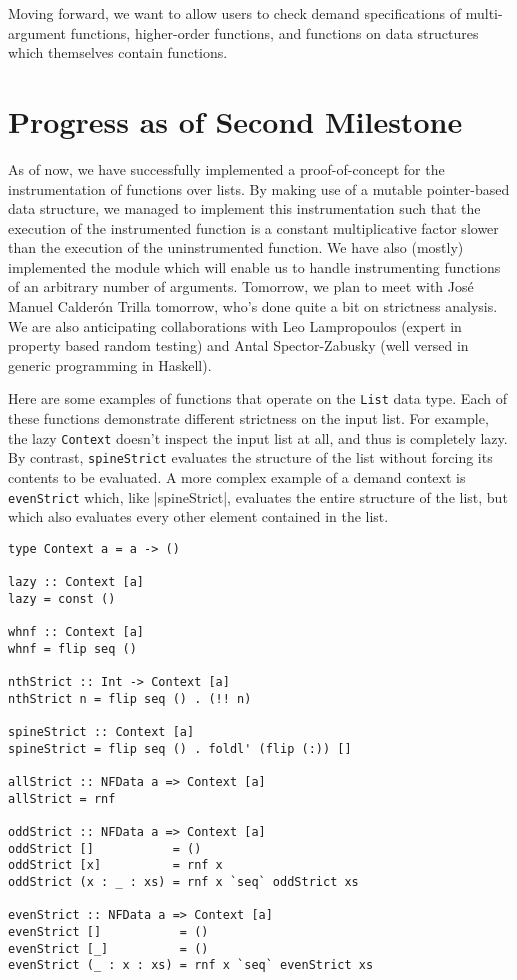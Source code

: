 \documentclass{article}
\begin{document}
Moving forward, we want to allow users to check demand specifications
of multi-argument functions, higher-order functions, and functions on
data structures which themselves contain functions.

\section{Progress as of Second Milestone}

As of now, we have successfully implemented a proof-of-concept for the
instrumentation of functions over lists. By making use of a mutable
pointer-based data structure, we managed to implement this instrumentation such
that the execution of the instrumented function is a constant multiplicative
factor slower than the execution of the uninstrumented function. We have also
(mostly) implemented the module which will enable us to handle instrumenting
functions of an arbitrary number of arguments. Tomorrow, we plan to meet with
Jos\'e Manuel Calder\'on Trilla tomorrow, who's done quite a bit on strictness
analysis. We are also anticipating collaborations with Leo Lampropoulos (expert
in property based random testing) and Antal Spector-Zabusky (well versed in
generic programming in Haskell).

Here are some examples of functions that operate on the \verb|List| data type.
Each of these functions demonstrate different strictness on the input list. For example, the lazy \verb|Context| doesn't inspect the input list at all, and thus is completely lazy. By contrast, \verb|spineStrict| evaluates the structure of the list without forcing its contents to be evaluated. A more complex example of a demand context is \verb|evenStrict| which, like |spineStrict|, evaluates the entire structure of the list, but which also evaluates every other element contained in the list.

\begin{verbatim}
type Context a = a -> ()

lazy :: Context [a]
lazy = const ()

whnf :: Context [a]
whnf = flip seq ()

nthStrict :: Int -> Context [a]
nthStrict n = flip seq () . (!! n)

spineStrict :: Context [a]
spineStrict = flip seq () . foldl' (flip (:)) []

allStrict :: NFData a => Context [a]
allStrict = rnf

oddStrict :: NFData a => Context [a]
oddStrict []           = ()
oddStrict [x]          = rnf x
oddStrict (x : _ : xs) = rnf x `seq` oddStrict xs

evenStrict :: NFData a => Context [a]
evenStrict []           = ()
evenStrict [_]          = ()
evenStrict (_ : x : xs) = rnf x `seq` evenStrict xs
\end{verbatim}
\end{document}
